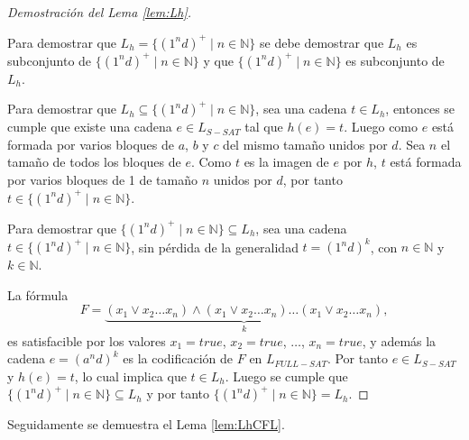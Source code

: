 \documentclass[12pt]{article}
\begin{document}
\begin{proof}[Demostración del Lema \ref{lem:Lh}] \
    
    Para demostrar que $L_h=\{(1^nd)^+\mid n\in \mathbb{N}\}$ se debe demostrar que $L_h$ es subconjunto de $\{(1^nd)^+\mid n\in \mathbb{N}\}$ y 
    que $\{(1^nd)^+\mid n\in \mathbb{N}\}$ es subconjunto de $L_h$.
    
    Para demostrar que $L_h\subseteq \{(1^nd)^+\mid n\in \mathbb{N}\}$, sea una cadena $t\in L_h$, entonces se cumple que existe una cadena $e\in L_{S-SAT}$ tal que $h(e)=t$. Luego como $e$ está formada por varios bloques de $a$, $b$ y $c$ del mismo tamaño unidos por $d$. Sea $n$ el tamaño de todos los bloques de $e$. Como $t$ es la imagen de $e$ por $h$, $t$ está formada por varios bloques de 1 de tamaño $n$ unidos por $d$, por tanto $t\in \{(1^nd)^+\mid n\in \mathbb{N}\}$.
    
    Para demostrar que $\{(1^nd)^+\mid n\in \mathbb{N}\}\subseteq L_h$, sea una cadena $t\in \{(1^nd)^+\mid n\in \mathbb{N}\}$, sin pérdida de la generalidad $t=(1^nd)^k$, con $n\in \mathbb{N}$ y $k\in \mathbb{N}$.
    
    La fórmula
    $$F=\underbrace{(x_1\vee x_2 \ldots x_n) \wedge (x_1\vee x_2 \ldots x_n) \ldots (x_1\vee x_2 \ldots x_n)}_{k},$$
    es satisfacible por los valores $x_1=true$, $x_2=true$, $\ldots$, $x_n=true$, y además la cadena $e=(a^nd)^k$ es la codificación de $F$ en $L_{FULL-SAT}$. Por tanto $e\in L_{S-SAT}$ y $h(e)=t$, lo cual implica que $t\in L_h$. Luego se cumple que $\{(1^nd)^+\mid n\in \mathbb{N}\}\subseteq L_h$ y por tanto $\{(1^nd)^+\mid n\in \mathbb{N}\}= L_h$.
\end{proof}

Seguidamente se demuestra el Lema \ref{lem:LhCFL}.
\end{document}
